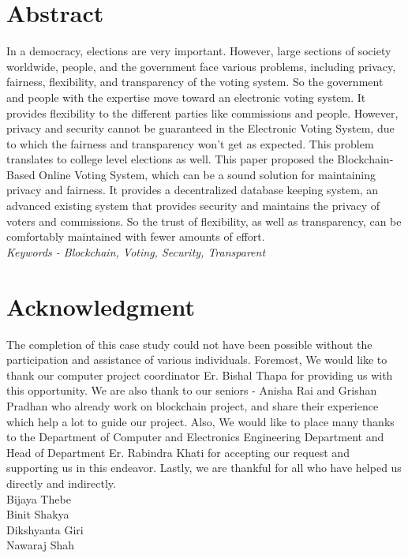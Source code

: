 \documentclass[a4paper,12pt]{report}
\begin{document}

\chapter*{Abstract}
In a democracy, elections are very important. However, large sections of society worldwide, people, and the government face various problems, including privacy, fairness, flexibility, and transparency of the voting system. So the government and people with the expertise move toward an electronic voting system. It provides flexibility to the different parties like commissions and people. However, privacy and security cannot be guaranteed in the Electronic Voting System, due to which the fairness and transparency won’t get as expected. This problem translates to college level elections as well. This paper proposed the Blockchain-Based Online Voting System, which can be a sound solution for maintaining privacy and fairness. It provides a decentralized database keeping system, an advanced  existing system that provides security and maintains the privacy of voters and commissions. So the trust of flexibility, as well as transparency, can be comfortably maintained with fewer amounts of effort.
\\
\textit{Keywords - Blockchain, Voting, Security, Transparent}
\chapter*{Acknowledgment}
The completion of this case study could not have been possible without the participation and assistance of various individuals. Foremost, We would  like to thank our computer project coordinator Er. Bishal Thapa for providing us with this opportunity.  We are also thank to our seniors - Anisha Rai and Grishan Pradhan who already work on blockchain project, and share their experience which help a lot to guide our project. Also, We would like to place many thanks to the Department of Computer and Electronics Engineering Department and Head of Department Er. Rabindra Khati for accepting our request and supporting us in this endeavor. Lastly, we are thankful for all who have helped us directly and indirectly.\\
Bijaya Thebe\\
Binit Shakya\\
Dikshyanta Giri\\
Nawaraj Shah

\renewcommand*\contentsname{Table of Contents}
\tableofcontents
\end{document}
